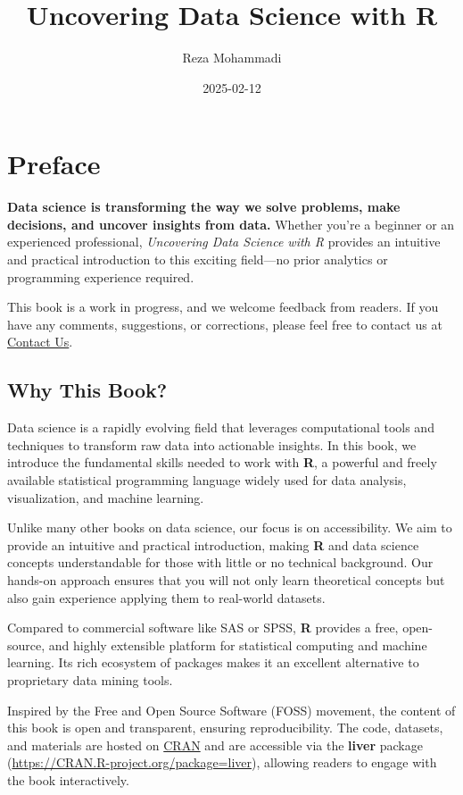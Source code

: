 \documentclass[
]{book}
\title{Uncovering Data Science with R}
\author{Reza Mohammadi}
\date{2025-02-12}
\theoremstyle{definition}
\theoremstyle{definition}
\theoremstyle{definition}
\theoremstyle{definition}
\theoremstyle{remark}
\begin{document}
\maketitle

{
\setcounter{tocdepth}{1}
\tableofcontents
}
\chapter*{Preface}\label{preface}

\textbf{Data science is transforming the way we solve problems, make decisions, and uncover insights from data.} Whether you're a beginner or an experienced professional, \emph{Uncovering Data Science with R} provides an intuitive and practical introduction to this exciting field---no prior analytics or programming experience required.

This book is a work in progress, and we welcome feedback from readers. If you have any comments, suggestions, or corrections, please feel free to contact us at \href{mailto:a.mohammadi@uva.nl}{Contact Us}.

\section*{Why This Book?}\label{why-this-book}

Data science is a rapidly evolving field that leverages computational tools and techniques to transform raw data into actionable insights. In this book, we introduce the fundamental skills needed to work with \textbf{R}, a powerful and freely available statistical programming language widely used for data analysis, visualization, and machine learning.

Unlike many other books on data science, our focus is on accessibility. We aim to provide an intuitive and practical introduction, making \textbf{R} and data science concepts understandable for those with little or no technical background. Our hands-on approach ensures that you will not only learn theoretical concepts but also gain experience applying them to real-world datasets.

Compared to commercial software like SAS or SPSS, \textbf{R} provides a free, open-source, and highly extensible platform for statistical computing and machine learning. Its rich ecosystem of packages makes it an excellent alternative to proprietary data mining tools.

Inspired by the Free and Open Source Software (FOSS) movement, the content of this book is open and transparent, ensuring reproducibility. The code, datasets, and materials are hosted on \href{https://cran.r-project.org/web/packages/liver/index.html}{CRAN} and are accessible via the \textbf{liver} package (\url{https://CRAN.R-project.org/package=liver}), allowing readers to engage with the book interactively.
\end{document}
